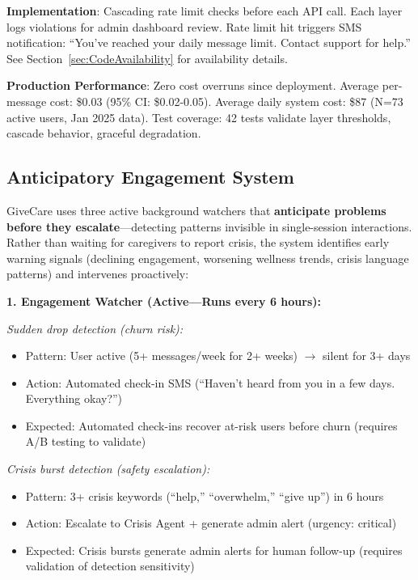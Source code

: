 \documentclass{article}
\begin{document}
\textbf{Implementation}: Cascading rate limit checks before each API call. Each layer logs violations for admin dashboard review. Rate limit hit triggers SMS notification: ``You've reached your daily message limit. Contact support for help.'' See Section~\ref{sec:CodeAvailability} for availability details.

\textbf{Production Performance}: Zero cost overruns since deployment. Average per-message cost: \$0.03 (95\% CI: \$0.02-0.05). Average daily system cost: \$87 (N=73 active users, Jan 2025 data). Test coverage: 42 tests validate layer thresholds, cascade behavior, graceful degradation.


%
\subsection{Anticipatory Engagement System}%
\label{subsec:AnticipatorEngagementSystem}%
GiveCare uses three active background watchers that \textbf{anticipate problems before they escalate}—detecting patterns invisible in single-session interactions. Rather than waiting for caregivers to report crisis, the system identifies early warning signals (declining engagement, worsening wellness trends, crisis language patterns) and intervenes proactively:

\textbf{1. Engagement Watcher (Active—Runs every 6 hours):}

\textit{Sudden drop detection (churn risk):}
\begin{itemize}
    \item Pattern: User active (5+ messages/week for 2+ weeks) $\rightarrow$ silent for 3+ days
    \item Action: Automated check-in SMS (``Haven't heard from you in a few days. Everything okay?'')
    \item Expected: Automated check-ins recover at-risk users before churn (requires A/B testing to validate)
\end{itemize}

\textit{Crisis burst detection (safety escalation):}
\begin{itemize}
    \item Pattern: 3+ crisis keywords (``help,'' ``overwhelm,'' ``give up'') in 6 hours
    \item Action: Escalate to Crisis Agent + generate admin alert (urgency: critical)
    \item Expected: Crisis bursts generate admin alerts for human follow-up (requires validation of detection sensitivity)
\end{itemize}
\end{document}
